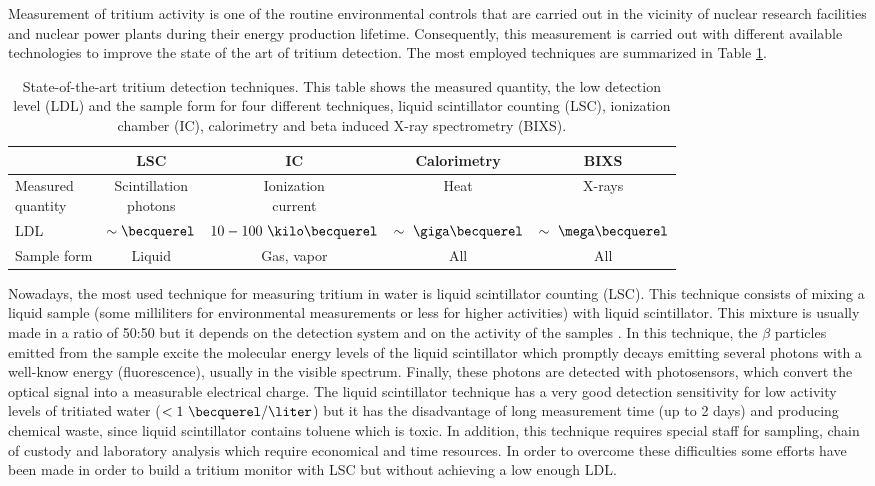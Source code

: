 Measurement of tritium activity is one of the routine environmental controls that are carried out in the vicinity of nuclear research facilities and nuclear power plants during their energy production lifetime. Consequently, this measurement is carried out with different available technologies to improve the state of the art of tritium detection. The most employed techniques are summarized in Table \ref{tab:DifferentThecnics}.

\begin{table}[htbp]
\centering{}%
\begin{tabular}{lcccc}
\toprule 
 & LSC & IC & Calorimetry & BIXS \tabularnewline
\midrule
\midrule 
\parbox{5em}{Measured\\ quantity} & \parbox{5em}{\centering Scintillation\\ photons} &  \parbox{5em}{\centering Ionization\\ current} & Heat & X-rays \tabularnewline
LDL & $\sim\becquerel$ & $10-100~\kilo\becquerel$ & $\sim~\giga\becquerel$ & $\sim~\mega\becquerel$ \tabularnewline
Sample form & Liquid & Gas, vapor & All & All \tabularnewline
\bottomrule
\end{tabular}
\caption{State-of-the-art tritium detection techniques. This table shows the measured quantity, the low detection level (LDL) and the sample form for four different techniques, liquid scintillator counting (LSC), ionization chamber (IC), calorimetry and beta induced X-ray spectrometry (BIXS).}
\label{tab:DifferentThecnics}
\end{table}

Nowadays, the most used technique for measuring tritium in water is liquid scintillator counting (LSC). This technique consists of mixing a liquid sample (some milliliters for environmental measurements or less for higher activities) with liquid scintillator. This mixture is usually made in a ratio of 50:50 but it depends on the detection system and on the activity of the samples \cite{LSCothers, HofstetterSeveral}. In this technique, the $\beta$ particles emitted from the sample excite the molecular energy levels of the liquid scintillator which promptly decays emitting several photons with a well-know energy (fluorescence), usually in the visible spectrum. Finally, these photons are detected with photosensors, which convert the optical signal into a measurable electrical charge. The liquid scintillator technique has a very good detection sensitivity for low activity levels of tritiated water ($<1~\becquerel/\liter$) \cite{0.6Bq_L} but it has the disadvantage of long measurement time (up to 2 days) and producing chemical waste, since liquid scintillator contains toluene which is toxic. In addition, this technique requires special staff for sampling, chain of custody and laboratory analysis which require economical and time resources. In order to overcome these difficulties some efforts have been made in order to build a tritium monitor with LSC but without achieving a low enough LDL\cite{OnlineLSC}. 

